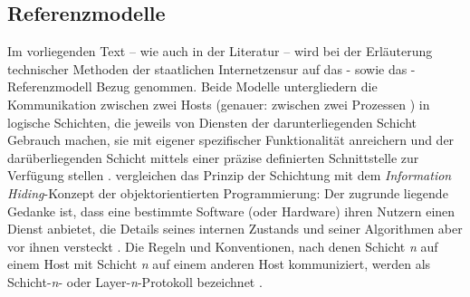 \subsection{Referenzmodelle} \label{referenzmodelle}
Im vorliegenden Text -- wie auch in der Literatur -- wird bei der Erläuterung technischer Methoden der staatlichen Internetzensur auf das -\autocite[Vgl.][1335\psqq]{Day1983} sowie das -Referenzmodell Bezug genommen. Beide Modelle untergliedern die Kommunikation zwischen zwei Hosts (genauer: zwischen zwei Prozessen \autocite[Vgl.][1338]{Day1983})  in logische Schichten, die jeweils von Diensten der darunterliegenden Schicht Gebrauch machen, sie mit eigener spezifischer Funktionalität anreichern und der darüberliegenden Schicht mittels einer präzise definierten Schnittstelle zur Verfügung stellen \autocite[Vgl.][1338]{Day1983}. \citeauthor{Tanenbaum2010} vergleichen das Prinzip der Schichtung mit dem \textit{Information Hiding}-Konzept der objektorientierten Programmierung: Der zugrunde liegende Gedanke ist, dass eine bestimmte Software (oder Hardware) ihren Nutzern einen Dienst anbietet, die Details seines internen Zustands und seiner Algorithmen aber vor ihnen versteckt \autocite[Vgl.][29]{Tanenbaum2010}. Die Regeln und Konventionen, nach denen Schicht \textit{n} auf einem Host mit Schicht \textit{n} auf einem anderen Host kommuniziert, werden als Schicht-\textit{n}- oder Layer-\textit{n}-Protokoll bezeichnet \autocite[Vgl.][29]{Tanenbaum2010}. 
